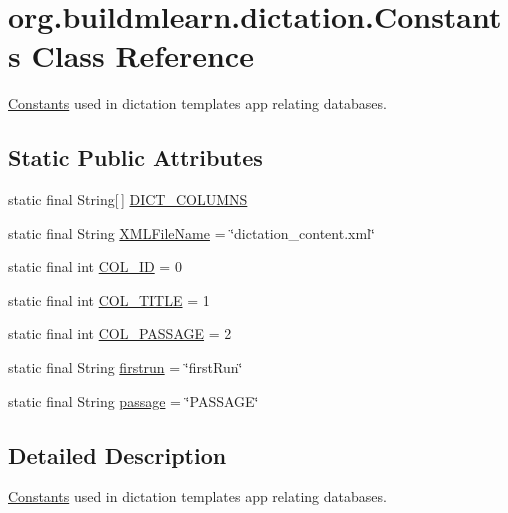 \hypertarget{classorg_1_1buildmlearn_1_1dictation_1_1Constants}{}\section{org.\+buildmlearn.\+dictation.\+Constants Class Reference}
\label{classorg_1_1buildmlearn_1_1dictation_1_1Constants}


\hyperlink{classorg_1_1buildmlearn_1_1dictation_1_1Constants}{Constants} used in dictation template\textquotesingle{}s app relating databases.  


\subsection*{Static Public Attributes}
\begin{DoxyCompactItemize}
\item 
static final String\mbox{[}$\,$\mbox{]} \hyperlink{classorg_1_1buildmlearn_1_1dictation_1_1Constants_af21e88e62f221e891f353a7599f4dea3}{D\+I\+C\+T\+\_\+\+C\+O\+L\+U\+M\+NS}
\item 
static final String \hyperlink{classorg_1_1buildmlearn_1_1dictation_1_1Constants_a09a95a6f970bf443c321b3121a4f088e}{X\+M\+L\+File\+Name} = \char`\"{}dictation\+\_\+content.\+xml\char`\"{}
\item 
static final int \hyperlink{classorg_1_1buildmlearn_1_1dictation_1_1Constants_a316d61b8b11e603ad79ce777f3f1dc44}{C\+O\+L\+\_\+\+ID} = 0
\item 
static final int \hyperlink{classorg_1_1buildmlearn_1_1dictation_1_1Constants_a619a1b5bd4eeae6b519388971630c7b0}{C\+O\+L\+\_\+\+T\+I\+T\+LE} = 1
\item 
static final int \hyperlink{classorg_1_1buildmlearn_1_1dictation_1_1Constants_a4629635671076e3d414a437ce0f0e2a9}{C\+O\+L\+\_\+\+P\+A\+S\+S\+A\+GE} = 2
\item 
static final String \hyperlink{classorg_1_1buildmlearn_1_1dictation_1_1Constants_a3e78fd135b98935f0b99c03338c7e61b}{firstrun} = \char`\"{}first\+Run\char`\"{}
\item 
static final String \hyperlink{classorg_1_1buildmlearn_1_1dictation_1_1Constants_a80e817295b7afa2e5b5168936e0021b7}{passage} = \char`\"{}P\+A\+S\+S\+A\+GE\char`\"{}
\end{DoxyCompactItemize}


\subsection{Detailed Description}
\hyperlink{classorg_1_1buildmlearn_1_1dictation_1_1Constants}{Constants} used in dictation template\textquotesingle{}s app relating databases. 

